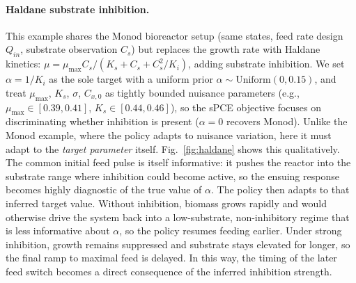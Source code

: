 \documentclass[conference]{IEEEtran}
\begin{document}
\paragraph{Haldane substrate inhibition.}
This example shares the Monod bioreactor setup (same states, feed rate design $Q_{in}$, substrate observation $C_s$) but replaces the growth rate with Haldane kinetics: $\mu = \mu_{\max} C_s / (K_s + C_s + C_s^2/K_i)$, adding substrate inhibition. We set $\alpha = 1/K_i$ as the sole target with a uniform prior $\alpha \sim \text{Uniform}(0, 0.15)$, and treat $\mu_{\max}$, $K_s$, $\sigma$, $C_{x,0}$ as tightly bounded nuisance parameters (e.g., $\mu_{\max} \in [0.39, 0.41]$, $K_s \in [0.44, 0.46]$), so the sPCE objective focuses on discriminating whether inhibition is present ($\alpha = 0$ recovers Monod).
Unlike the Monod example, where the policy adapts to nuisance variation, here it must adapt to the \emph{target parameter} itself.
Fig.~\ref{fig:haldane} shows this qualitatively. The common initial feed pulse is itself informative: it pushes the reactor into the substrate range where inhibition could become active, so the ensuing response becomes highly diagnostic of the true value of $\alpha$. The policy then adapts to that inferred target value. Without inhibition, biomass grows rapidly and would otherwise drive the system back into a low-substrate, non-inhibitory regime that is less informative about $\alpha$, so the policy resumes feeding earlier. Under strong inhibition, growth remains suppressed and substrate stays elevated for longer, so the final ramp to maximal feed is delayed. In this way, the timing of the later feed switch becomes a direct consequence of the inferred inhibition strength.
\end{document}
